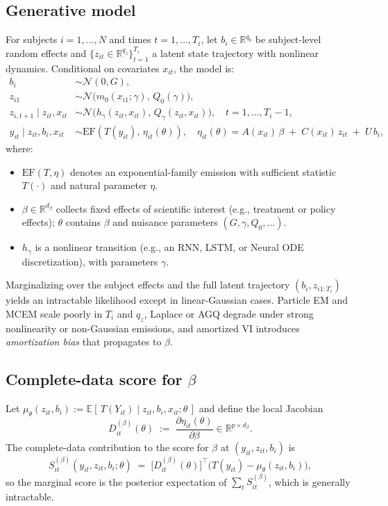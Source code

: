 \subsection{Generative model}
For subjects \(i=1,\dots,N\) and times \(t=1,\dots,T_i\), 
let \(b_i\in\mathbb{R}^{q_b}\) be subject-level random effects 
and \(\{z_{it}\in\mathbb{R}^{q_z}\}_{t=1}^{T_i}\) a latent state trajectory 
with nonlinear dynamics. Conditional on covariates \(x_{it}\), the model is:
\begin{align*}
b_i &\sim \mathcal{N}(0, G),\\
z_{i1} &\sim \mathcal{N}\!\big(m_0(x_{i1};\gamma),\, Q_0(\gamma)\big),\\
z_{i,t+1}\mid z_{it},x_{it} &\sim \mathcal{N}\!\big(h_\gamma(z_{it},x_{it}),\, Q_\gamma(z_{it},x_{it})\big),
\quad t=1,\dots,T_i-1,\\
y_{it}\mid z_{it},b_i,x_{it} &\sim \text{EF}\!\left(T(y_{it}),\, \eta_{it}(\theta)\right),
\quad \eta_{it}(\theta)=A(x_{it})\,\beta \;+\; C(x_{it})\, z_{it} \;+\; U\, b_i,
\end{align*}
where:
\begin{itemize}
\item \(\text{EF}(T,\eta)\) denotes an exponential-family emission with sufficient statistic \(T(\cdot)\) and natural parameter \(\eta\).
\item \(\beta\in\mathbb{R}^{d_\beta}\) collects fixed effects of scientific interest (e.g., treatment or policy effects); \(\theta\) contains \(\beta\) and nuisance parameters \((G,\gamma,Q_0,\ldots)\).
\item \(h_\gamma\) is a nonlinear transition (e.g., an RNN, LSTM, or Neural ODE discretization), with parameters \(\gamma\).
\end{itemize}
Marginalizing over the subject effects and the full latent trajectory \((b_i,z_{i1:T_i})\) yields an intractable likelihood except in linear-Gaussian cases. 
Particle EM and MCEM scale poorly in \(T_i\) and \(q_z\), 
Laplace or AGQ degrade under strong nonlinearity or non-Gaussian emissions, 
and amortized VI introduces \emph{amortization bias} that propagates to \(\beta\).

\subsection{Complete-data score for \texorpdfstring{$\beta$}{beta}}
Let \(\mu_\theta(z_{it},b_i):=\mathbb{E}[\,T(Y_{it})\mid z_{it},b_i,x_{it};\theta\,]\) 
and define the local Jacobian
\[
D_{it}^{(\beta)}(\theta)\;:=\;\frac{\partial \eta_{it}(\theta)}{\partial \beta}\in\mathbb{R}^{p\times d_\beta}.
\]
The complete-data contribution to the score for \(\beta\) at \((y_{it},z_{it},b_i)\) is
\[
S_{it}^{(\beta)}(y_{it},z_{it},b_i;\theta)
\;=\;
\big[D_{it}^{(\beta)}(\theta)\big]^\top \Big(T(y_{it})-\mu_\theta(z_{it},b_i)\Big),
\]
so the marginal score is the posterior expectation of \(\sum_t S_{it}^{(\beta)}\), 
which is generally intractable.

